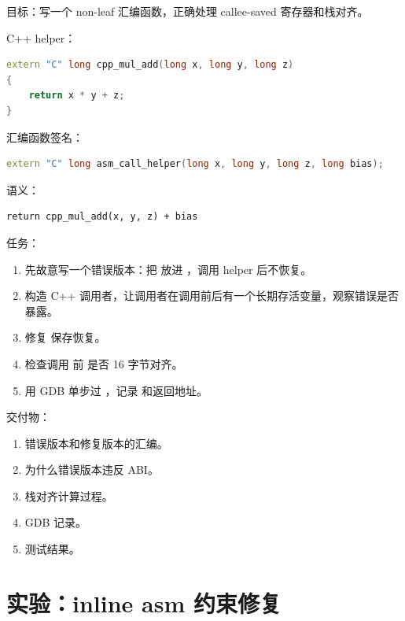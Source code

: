 \begin{labbox}
目标：写一个 non-leaf 汇编函数，正确处理 callee-saved 寄存器和栈对齐。

C++ helper：

\begin{lstlisting}[language=C++]
extern "C" long cpp_mul_add(long x, long y, long z)
{
    return x * y + z;
}
\end{lstlisting}

汇编函数签名：

\begin{lstlisting}[language=C++]
extern "C" long asm_call_helper(long x, long y, long z, long bias);
\end{lstlisting}

语义：

\begin{lstlisting}
return cpp_mul_add(x, y, z) + bias
\end{lstlisting}

任务：

\begin{enumerate}
  \item 先故意写一个错误版本：把  放进 ，调用 helper 后不恢复。
  \item 构造 C++ 调用者，让调用者在调用前后有一个长期存活变量，观察错误是否暴露。
  \item 修复  保存恢复。
  \item 检查调用  前  是否 16 字节对齐。
  \item 用 GDB 单步过 ，记录  和返回地址。
\end{enumerate}

交付物：

\begin{enumerate}
  \item 错误版本和修复版本的汇编。
  \item 为什么错误版本违反 ABI。
  \item 栈对齐计算过程。
  \item GDB 记录。
  \item 测试结果。
\end{enumerate}
\end{labbox}

\section{实验：inline asm 约束修复}

